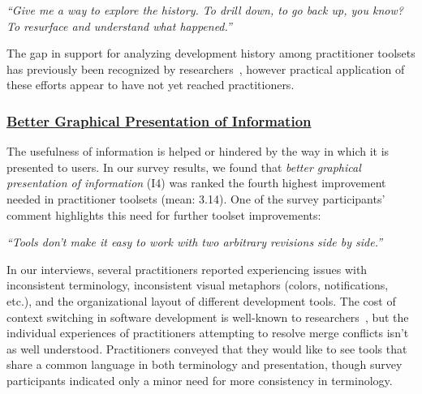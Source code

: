 \begin{displayquote}
\textit{``Give me a way to explore the history. To drill down, to go back up, you know? To resurface and understand what happened.''}
\end{displayquote}

The gap in support for analyzing development history among practitioner toolsets has previously been recognized by researchers~\cite{sun2015informationhistory}\cite{guo2016cold-start}\cite{yan2014miningcontracts}, however practical application of these efforts appear to have not yet reached practitioners.

\subsubsection{\underline{Better Graphical Presentation of Information}}
The usefulness of information is helped or hindered by the way in which it is presented to users.
In our survey results, we found that \textit{better graphical presentation of information} (I4) was ranked the fourth highest improvement needed in practitioner toolsets (mean: 3.14).
One of the survey participants' comment highlights this need for further toolset improvements:
\begin{displayquote}
\textit{``Tools don't make it easy to work with two arbitrary revisions side by side.''}
\end{displayquote}

In our interviews, several practitioners reported experiencing issues with inconsistent terminology, inconsistent visual metaphors (colors, notifications, etc.), and the organizational layout of different development tools.
The cost of context switching in software development is well-known to researchers~\cite{czerwinski2004taskswitching}\cite{li2007cost_of_context_switch}\cite{blackwell2002attentioninvestment}\cite{convertino2003dualview}, but the individual experiences of practitioners attempting to resolve merge conflicts isn't as well understood.
Practitioners conveyed that they would like to see tools that share a common language in both terminology and presentation, though survey participants indicated only a minor need for more consistency in terminology. 

